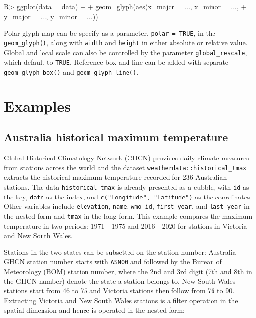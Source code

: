 \documentclass[
]{jss}
\begin{document}
\begin{CodeChunk}
\begin{CodeInput}
R> ggplot(data = data) +
+   geom_glyph(aes(x_major = ..., x_minor = ..., 
+                  y_major = ..., y_minor = ...))
\end{CodeInput}
\end{CodeChunk}

Polar glyph map can be specify as a parameter, \texttt{polar\ =\ TRUE},
in the \texttt{geom\_glyph()}, along with \texttt{width} and
\texttt{height} in either absolute or relative value. Global and local
scale can also be controlled by the parameter \texttt{global\_rescale},
which default to \texttt{TRUE}. Reference box and line can be added with
separate \texttt{geom\_glyph\_box()} and \texttt{geom\_glyph\_line()}.

\newpage

\hypertarget{examples}{%
\section{Examples}\label{examples}}

\hypertarget{australia-historical-maximum-temperature}{%
\subsection{Australia historical maximum
temperature}\label{australia-historical-maximum-temperature}}

Global Historical Climatology Network (GHCN) provides daily climate
measures from stations across the world and the dataset
\texttt{weatherdata::historical\_tmax} extracts the historical maximum
temperature recorded for 236 Australian stations. The data
\texttt{historical\_tmax} is already presented as a cubble, with
\texttt{id} as the key, \texttt{date} as the index, and
\texttt{c("longitude",\ "latitude")} as the coordinates. Other variables
include \texttt{elevation}, \texttt{name}, \texttt{wmo\_id},
\texttt{first\_year}, and \texttt{last\_year} in the nested form and
\texttt{tmax} in the long form. This example compares the maximum
temperature in two periods: 1971 - 1975 and 2016 - 2020 for stations in
Victoria and New South Wales.

Stations in the two states can be subsetted on the station number:
Australia GHCN station number starts with \texttt{ASN00} and followed by
the \href{http://www.bom.gov.au/climate/cdo/about/site-num.shtml}{Bureau
of Meteorology (BOM) station number}, where the 2nd and 3rd digit (7th
and 8th in the GHCN number) denote the state a station belongs to. New
South Wales stations start from 46 to 75 and Victoria stations then
follow from 76 to 90. Extracting Victoria and New South Wales stations
is a filter operation in the spatial dimension and hence is operated in
the nested form:
\end{document}
